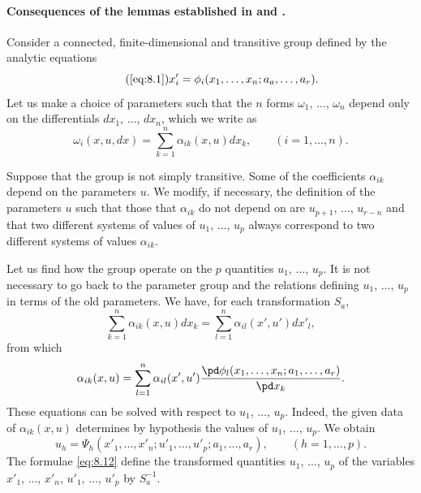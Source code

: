 \paragraph{Consequences of the lemmas established in  and .}
\label{sec:112}
Consider a connected, finite-dimensional and transitive group defined by the analytic equations
\begin{equation}
  \label{eq:8.1--}\tag{\ref{eq:8.1}}
  x'_{i}=\phi_{i}(x_{1},\dots,x_{n};a_{a},\dots,a_{r}).
\end{equation}
Let us make a choice of parameters such that the $n$ forms $\omega_{1}$, $\dots$, $\omega_{n}$ depend only on the differentials $dx_{1}$, $\dots$, $dx_{n}$, which we write as
\[
\omega_{i}(x,u,dx)=\sum_{k=1}^{n}\alpha_{ik}(x,u)dx_{k},\qquad(i=1,\dots,n).
\]

Suppose that the group is not simply transitive. Some of the coefficients $\alpha_{ik}$ depend on the parameters $u$. We modify, if necessary, the definition of the parameters $u$ such that those that $\alpha_{ik}$ do not depend on are $u_{p+1}$, $\dots$, $u_{r-n}$ and that two different systems of values of $u_{1}$, $\dots$, $u_{p}$ always correspond to two different systems of values $\alpha_{ik}$.

Let us find how the group operate on the $p$ quantities $u_{1}$, $\dots$, $u_{p}$. It is not necessary to go back to the parameter group and the relations defining $u_{1}$, $\dots$, $u_{p}$ in terms of the old parameters. We have, for each transformation $S_{a}$,
\[
\sum_{k=1}^{n}\alpha_{ik}(x,u)dx_{k}=\sum_{l=1}^{n}\alpha_{il}(x',u')dx'_{l},
\]
from which
\[
\alpha_{ik}(x,u)=\sum_{l=1}^{n}\alpha_{il}(x',u')\frac{\pd \phi_{l}(x_{1},\dots,x_{n};a_{1},\dots,a_{r})}{\pd x_{k}}.
\]
These equations can be solved with respect to $u_{1}$, $\dots$, $u_{p}$. Indeed, the given data of $\alpha_{ik}(x,u)$ determines by hypothesis the values of $u_{1}$, $\dots$, $u_{p}$. We obtain
\begin{equation}
  \label{eq:8.12}
  u_{h}=\Psi_{h}(x'_{1},\dots,x'_{n};u'_{1},\dots,u'_{p};a_{1},\dots,a_{r}),\qquad(h=1,\dots,p).
\end{equation}
The formulae \eqref{eq:8.12} define the transformed quantities $u_{1}$, $\dots$, $u_{p}$ of the variables $x'_{1}$, $\dots$, $x'_{n}$, $u'_{1}$, $\dots$, $u'_{p}$ by $S^{-1}_{a}$.

\somespace

